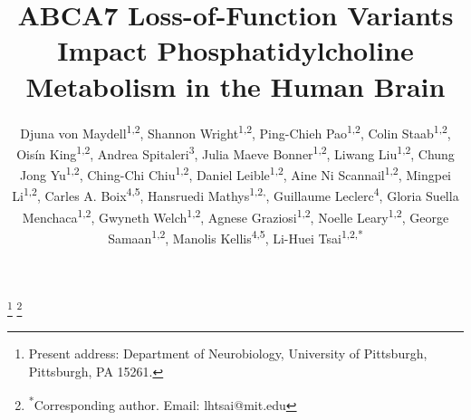 \title{ABCA7 Loss-of-Function Variants Impact Phosphatidylcholine Metabolism in the Human Brain}

\author{%
  \parbox{\textwidth}{%
    Djuna von Maydell\textsuperscript{1,2}, 
    Shannon Wright\textsuperscript{1,2}, 
    Ping-Chieh Pao\textsuperscript{1,2}, 
    Colin Staab\textsuperscript{1,2}, 
    Ois\'{i}n King\textsuperscript{1,2}, 
    Andrea Spitaleri\textsuperscript{3}, 
    Julia Maeve Bonner\textsuperscript{1,2}, 
    Liwang Liu\textsuperscript{1,2}, 
    Chung Jong Yu\textsuperscript{1,2}, 
    Ching-Chi Chiu\textsuperscript{1,2}, 
    Daniel Leible\textsuperscript{1,2}, 
    Aine Ni Scannail\textsuperscript{1,2}, 
    Mingpei Li\textsuperscript{1,2}, 
    Carles A. Boix\textsuperscript{4,5}, 
    Hansruedi Mathys\textsuperscript{1,2,\textdaggerdbl}, 
    Guillaume Leclerc\textsuperscript{4}, 
    Gloria Suella Menchaca\textsuperscript{1,2}, 
    Gwyneth Welch\textsuperscript{1,2}, 
    Agnese Graziosi\textsuperscript{1,2}, 
    Noelle Leary\textsuperscript{1,2}, 
    George Samaan\textsuperscript{1,2}, 
    Manolis Kellis\textsuperscript{4,5}, 
    Li-Huei Tsai\textsuperscript{1,2,*}
  }%
}

\date{}
\maketitle


\thanks{\textsuperscript{\textdaggerdbl}Present address: Department of Neurobiology, University of Pittsburgh, Pittsburgh, PA 15261.}
\thanks{\textsuperscript{*}Corresponding author. Email: lhtsai@mit.edu}



